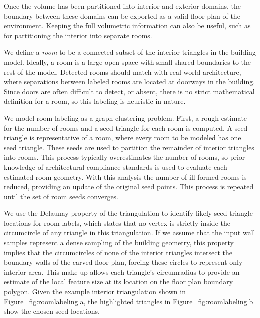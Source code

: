 \documentclass[12pt,onecolumn,oneside]{book}
\begin{document}
Once the volume has been partitioned into interior and exterior domains, the boundary between these domains can be exported as a valid floor plan of the environment.  Keeping the full volumetric information can also be useful, such as for partitioning the interior into separate rooms.

We define a {\it room} to be a connected subset of the interior triangles in the building model.  Ideally, a room is a large open space with small shared boundaries to the rest of the model.  Detected rooms should match with real-world architecture, where separations between labeled rooms are located at doorways in the building.  Since doors are often difficult to detect, or absent, there is no strict mathematical definition for a room, so this labeling is heuristic in nature.

We model room labeling as a graph-clustering problem.  First, a rough estimate for the number of rooms and a seed triangle for each room is computed.  A seed triangle is representative of a room, where every room to be modeled has one seed triangle.  These seeds are used to partition the remainder of interior triangles into rooms.  This process typically overestimates the number of rooms, so prior knowledge of architectural compliance standards is used to evaluate each estimated room geometry.  With this analysis the number of ill-formed rooms is reduced, providing an update of the original seed points.  This process is repeated until the set of room seeds converges.


We use the Delaunay property of the triangulation to identify likely seed triangle locations for room labels, which states that no vertex is strictly inside the circumcircle of any triangle in this triangulation.  If we assume that the input wall samples represent a dense sampling of the building geometry, this property implies that the circumcircles of none of the interior triangles intersect the boundary walls of the carved floor plan, forcing these circles to represent only interior area.  This make-up allows each triangle's circumradius to provide an estimate of the local feature size at its location on the floor plan boundary polygon.  Given the example interior triangulation shown in Figure~\ref{fig:roomlabeling}a, the highlighted triangles in Figure~\ref{fig:roomlabeling}b show the chosen seed locations.
\end{document}
